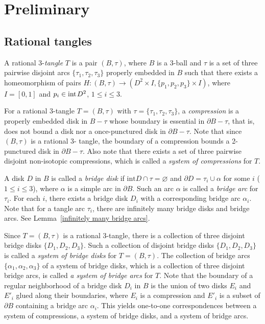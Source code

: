 \documentclass[12pt]{amsart}
\begin{document}
\section{Preliminary}\label{B2}



\subsection{Rational tangles}\label{B2-1}\hfill
A rational $3$-\textit{tangle} $T$ is a pair $(B, \tau)$, where $B$ is a 3-ball and $\tau$ is a set of three pairwise disjoint arcs $\{\tau_1, \tau_2, \tau_3\}$ properly embedded in $B$ such that there exists a homeomorphism of pairs ${H}: (B,\tau)\rightarrow (D^2\times I,\{p_1,p_2, p_3\}\times I)$, where $I=[0,1]$ and $p_i\in \text{int}\hskip 1pt D^2$, $1\leq i\leq 3$.

For a rational $3$-tangle $T=(B, \tau)$ with $\tau=\{\tau_1, \tau_2, \tau_3\}$, a \textit{compression} is a properly embedded disk in $B-\tau$ whose boundary is essential in $\partial B-\tau$, that is, does not bound a disk nor a once-punctured disk in $\partial B-\tau$. Note that since $(B, \tau)$ is a rational 3- tangle,
the boundary of a compression bounds a 2-punctured disk in $\partial B-\tau$. Also
note that there exists a set of three pairwise disjoint non-isotopic compressions, which is called a \textit{system of compressions} for $T$.

A disk $D$ in $B$ is called a \textit{bridge disk} if
$\text{int}D\cap \tau=\varnothing$ and $\partial D=\tau_i\cup \alpha$ for some $i$ ($1\leq i \leq 3$), where $\alpha$ is
a simple arc in $\partial B$. Such an arc $\alpha$ is called a \textit{bridge arc} for $\tau_i$.
For each $i$, there exists a bridge disk $D_i$ with a corresponding bridge arc $\alpha_i$. Note that for a tangle arc $\tau_i$,
there are infinitely many bridge disks and bridge arcs. See Lemma~\ref{infinitely many bridge arcs}.



Since $T=(B, \tau)$ is a rational 3-tangle,
there is a collection of three disjoint bridge disks $\{D_1, D_2, D_3\}$. Such a collection of disjoint bridge disks $\{D_1, D_2, D_3\}$ is
called a \textit{system of bridge disks} for $T=(B, \tau)$. The collection of bridge arcs $\{\alpha_1, \alpha_2, \alpha_3\}$ of a system of bridge disks, which is a collection of three disjoint bridge arcs, is called \textit{a system of bridge arcs} for $T$.
Note that the boundary of a regular neighborhood of a bridge disk $D_i$ in $B$ is the union
of two disks $E_i$ and $E'_i$ glued along their boundaries, where $E_i$ is a compression and $E'_i$ is a subset of $\partial B$ containing a bridge arc $\alpha_i$.
This yields one-to-one correspondences between a system of compressions, a system of bridge disks, and a system of bridge arcs.
\end{document}
